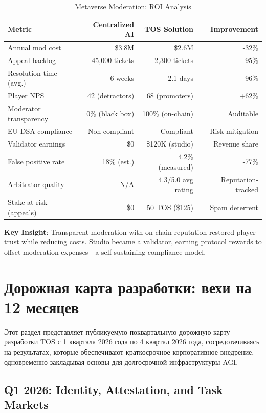\documentclass[11pt]{article}
\begin{document}
\begin{table}[H]
\centering
\caption{Metaverse Moderation: ROI Analysis}
\label{tab:metaverse-roi}
\begin{tabular}{@{}lrrr@{}}
\toprule
\textbf{Metric} & \textbf{Centralized AI} & \textbf{TOS Solution} & \textbf{Improvement} \\ \midrule
Annual mod cost & \$3.8M & \$2.6M & -32\% \\
Appeal backlog & 45,000 tickets & 2,300 tickets & -95\% \\
Resolution time (avg.) & 6 weeks & 2.1 days & -96\% \\
Player NPS & 42 (detractors) & 68 (promoters) & +62\% \\
Moderator transparency & 0\% (black box) & 100\% (on-chain) & Auditable \\
EU DSA compliance & Non-compliant & Compliant & Risk mitigation \\
Validator earnings & \$0 & \$120K (studio) & Revenue share \\
False positive rate & 18\% (est.) & 4.2\% (measured) & -77\% \\
Arbitrator quality & N/A & 4.3/5.0 avg rating & Reputation-tracked \\
Stake-at-risk (appeals) & \$0 & 50 TOS (\$125) & Spam deterrent \\
\bottomrule
\end{tabular}
\end{table}

\textbf{Key Insight}: Transparent moderation with on-chain reputation restored player trust while reducing costs. Studio became a validator, earning protocol rewards to offset moderation expenses—a self-sustaining compliance model.

\section{Дорожная карта разработки: вехи на 12 месяцев}
\label{sec:12month-roadmap}

Этот раздел представляет публикуемую поквартальную дорожную карту разработки TOS с 1 квартала 2026 года по 4 квартал 2026 года, сосредотачиваясь на результатах, которые обеспечивают краткосрочное корпоративное внедрение, одновременно закладывая основы для долгосрочной инфраструктуры AGI.

\subsection{Q1 2026: Identity, Attestation, and Task Markets}
\end{document}
